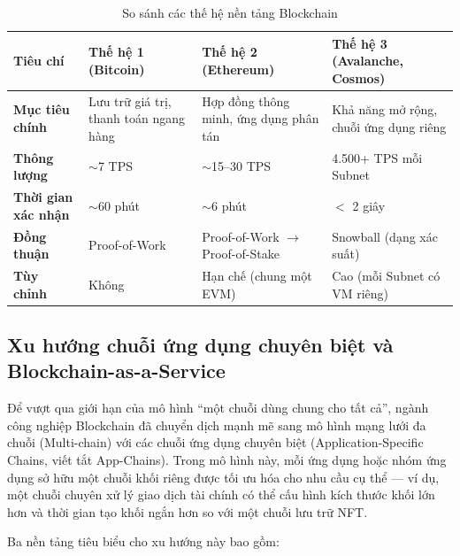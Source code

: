 \begin{table}[H]
\centering
\caption{So sánh các thế hệ nền tảng Blockchain}
\label{tab:blockchain_generations}
\begin{tabular}{|l|p{3.5cm}|p{3.5cm}|p{4.5cm}|}
\hline
\textbf{Tiêu chí} & \textbf{Thế hệ 1 (Bitcoin)} & \textbf{Thế hệ 2 (Ethereum)} & \textbf{Thế hệ 3 (Avalanche, Cosmos)} \\ \hline
\textbf{Mục tiêu chính} & Lưu trữ giá trị, thanh toán ngang hàng & Hợp đồng thông minh, ứng dụng phân tán & Khả năng mở rộng, chuỗi ứng dụng riêng \\ \hline
\textbf{Thông lượng} & $\sim$7 TPS & $\sim$15--30 TPS & 4.500+ TPS mỗi Subnet \\ \hline
\textbf{Thời gian xác nhận} & $\sim$60 phút & $\sim$6 phút & $<$ 2 giây \\ \hline
\textbf{Đồng thuận} & Proof-of-Work & Proof-of-Work $\rightarrow$ Proof-of-Stake & Snowball (dạng xác suất) \\ \hline
\textbf{Tùy chỉnh} & Không & Hạn chế (chung một EVM) & Cao (mỗi Subnet có VM riêng) \\ \hline
\end{tabular}
\end{table}

\subsection{Xu hướng chuỗi ứng dụng chuyên biệt và Blockchain-as-a-Service}

Để vượt qua giới hạn của mô hình ``một chuỗi dùng chung cho tất cả'', ngành công nghiệp Blockchain đã chuyển dịch mạnh mẽ sang mô hình mạng lưới đa chuỗi (Multi-chain) với các chuỗi ứng dụng chuyên biệt (Application-Specific Chains, viết tắt App-Chains). Trong mô hình này, mỗi ứng dụng hoặc nhóm ứng dụng sở hữu một chuỗi khối riêng được tối ưu hóa cho nhu cầu cụ thể --- ví dụ, một chuỗi chuyên xử lý giao dịch tài chính có thể cấu hình kích thước khối lớn hơn và thời gian tạo khối ngắn hơn so với một chuỗi lưu trữ NFT.

Ba nền tảng tiêu biểu cho xu hướng này bao gồm:


